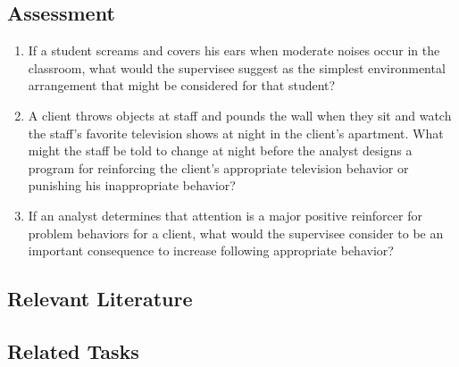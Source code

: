 \subsection{Assessment}
\begin{enumerate}
\item If a student screams and covers his ears when moderate noises occur in the classroom, what would the supervisee suggest as the simplest environmental arrangement that might be considered for that student?
\item A client throws objects at staff and pounds the wall when they sit and watch the staff's favorite television shows at night in the client's apartment. What might the staff be told to change at night before the analyst designs a program for reinforcing the client's appropriate television behavior or punishing his inappropriate behavior?
\item If an analyst determines that attention is a major positive reinforcer for problem behaviors for a client, what would the supervisee consider to be an important consequence to increase following appropriate behavior?
%
\end{enumerate}
%
\subsection{Relevant Literature}
\begin{refsection}
\nocite{test,alang2017police,clayton2018black}
\printbibliography[heading=none]
\end{refsection}
%
\subsection{Related Tasks}
\fourbTwo{}\\
\fourdTwentyOne{}\\
\foureOne{}\\
\foureThree{}\\
\fouriThree{}\\
\fouriFive{}\\
\fouriSix{}\\
\fourjFour{}\\
\fourjFive{}\\
\fourjSix{}\\
\fourjSeven{}\\
\fourjEight{}\\
\fourjTen{}\\
\fourjTwelve{}\\
\fourkNine{}\\
\fourFKFive{}\\
\fourFKSix{}\\
\fourFKTwentyThree{}\\
\fourFKTwentySix{}\\
\fourFKThirtyThree{}\\
%
%
%
%
%
%
%
%
%
